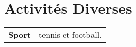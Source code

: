 \documentclass[10pt, a4paper]{article}
\begin{document}

\section{Activités Diverses}

\begin{tabular}{p{} p{}}

\textbf{Sport} & tennis et football. \\ 

\end{tabular}

\end{document}
